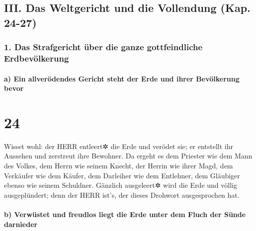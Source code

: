 \hypertarget{iii.-das-weltgericht-und-die-vollendung-kap.-24-27}{%
\subsection{III. Das Weltgericht und die Vollendung (Kap.
24-27)}\label{iii.-das-weltgericht-und-die-vollendung-kap.-24-27}}

\hypertarget{das-strafgericht-uxfcber-die-ganze-gottfeindliche-erdbevuxf6lkerung}{%
\subsubsection{1. Das Strafgericht über die ganze gottfeindliche
Erdbevölkerung}\label{das-strafgericht-uxfcber-die-ganze-gottfeindliche-erdbevuxf6lkerung}}

\hypertarget{a-ein-allveruxf6dendes-gericht-steht-der-erde-und-ihrer-bevuxf6lkerung-bevor}{%
\paragraph{a) Ein allverödendes Gericht steht der Erde und ihrer
Bevölkerung
bevor}\label{a-ein-allveruxf6dendes-gericht-steht-der-erde-und-ihrer-bevuxf6lkerung-bevor}}

\hypertarget{section-23}{%
\section{24}\label{section-23}}

Wisset wohl: der HERR entleert✲ die Erde und verödet sie;
er entstellt ihr Aussehen und zerstreut ihre Bewohner. Da
ergeht es dem Priester wie dem Mann des Volkes, dem Herrn wie seinem
Knecht, der Herrin wie ihrer Magd, dem Verkäufer wie dem Käufer, dem
Darleiher wie dem Entlehner, dem Gläubiger ebenso wie seinem Schuldner.
Gänzlich ausgeleert✲ wird die Erde und völlig
ausgeplündert; denn der HERR ist's, der dieses Drohwort ausgesprochen
hat.

\hypertarget{b-verwuxfcstet-und-freudlos-liegt-die-erde-unter-dem-fluch-der-suxfcnde-darnieder}{%
\paragraph{b) Verwüstet und freudlos liegt die Erde unter dem Fluch der
Sünde
darnieder}\label{b-verwuxfcstet-und-freudlos-liegt-die-erde-unter-dem-fluch-der-suxfcnde-darnieder}}

